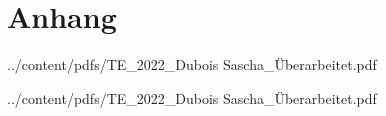 
\section{Anhang}


{../content/pdfs/TE_2022_Dubois Sascha_Überarbeitet.pdf}

{../content/pdfs/TE_2022_Dubois Sascha_Überarbeitet.pdf}